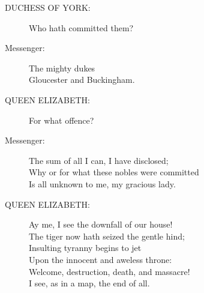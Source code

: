 \documentclass{article}
\begin{document}
\begin{description}
\item[DUCHESS OF YORK:] 
\hspace{1pt}Who hath committed them?\\
\end{description}
\begin{description}
\item[Messenger:] 
\hspace{1pt}The mighty dukes\\
\hspace{1pt}Gloucester and Buckingham.\\
\end{description}
\begin{description}
\item[QUEEN ELIZABETH:] 
\hspace{1pt}For what offence?\\
\end{description}
\begin{description}
\item[Messenger:] 
\hspace{1pt}The sum of all I can, I have disclosed;\\
\hspace{1pt}Why or for what these nobles were committed\\
\hspace{1pt}Is all unknown to me, my gracious lady.\\
\end{description}
\begin{description}
\item[QUEEN ELIZABETH:] 
\hspace{1pt}Ay me, I see the downfall of our house!\\
\hspace{1pt}The tiger now hath seized the gentle hind;\\
\hspace{1pt}Insulting tyranny begins to jet\\
\hspace{1pt}Upon the innocent and aweless throne:\\
\hspace{1pt}Welcome, destruction, death, and massacre!\\
\hspace{1pt}I see, as in a map, the end of all.\\
\end{description}
\end{document}
